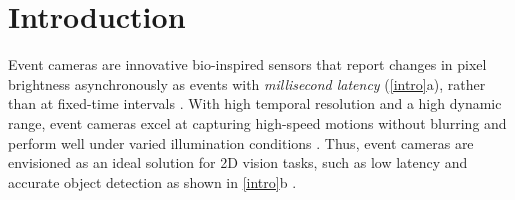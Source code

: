 \vspace{-0.5cm} 
\section{Introduction}



Event cameras are innovative bio-inspired sensors that report changes in pixel brightness asynchronously as events with \textit{millisecond latency} (\fig \ref{intro}a), rather than at fixed-time
intervals \cite{he2024microsaccade, gehrig2024low}.  
With high temporal resolution and a high dynamic range, event cameras excel at capturing high-speed motions without blurring and perform well under varied illumination conditions \cite{falanga2020dynamic, xu2023taming}.
Thus, event cameras are envisioned as an ideal solution for 2D vision tasks, such as low latency and accurate object detection as shown in \fig \ref{intro}b \cite{gallego2020event}.

